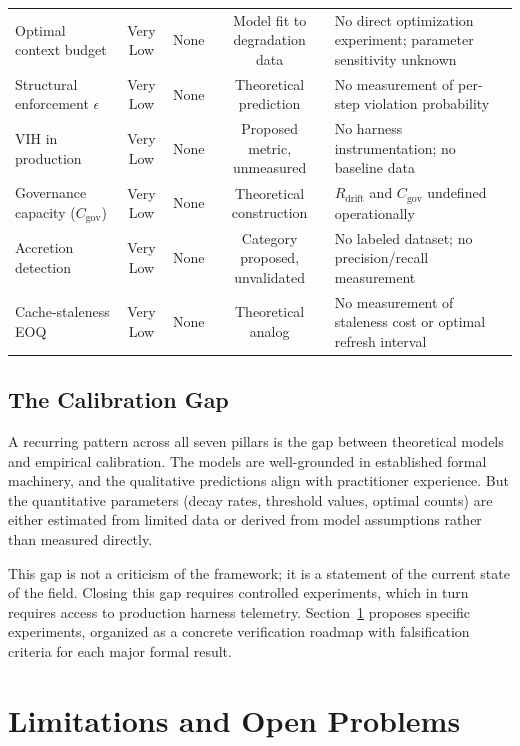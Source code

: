 \begin{table}[H]
\begin{tabular}{p{3cm}cccp{4.2cm}}
Optimal context budget & Very Low & None & Model fit to degradation data & No direct optimization experiment; parameter sensitivity unknown \\
\addlinespace
Structural enforcement $\epsilon$ & Very Low & None & Theoretical prediction & No measurement of per-step violation probability \\
\addlinespace
VIH in production & Very Low & None & Proposed metric, unmeasured & No harness instrumentation; no baseline data \\
\addlinespace
Governance capacity ($C_{\text{gov}}$) & Very Low & None & Theoretical construction & $R_{\text{drift}}$ and $C_{\text{gov}}$ undefined operationally \\
\addlinespace
Accretion detection & Very Low & None & Category proposed, unvalidated & No labeled dataset; no precision/recall measurement \\
\addlinespace
Cache-staleness EOQ & Very Low & None & Theoretical analog & No measurement of staleness cost or optimal refresh interval \\
\bottomrule
\end{tabular}
\end{table}

\subsection{The Calibration Gap}

A recurring pattern across all seven pillars is the gap between theoretical models and empirical calibration. The models are well-grounded in established formal machinery, and the qualitative predictions align with practitioner experience. But the quantitative parameters (decay rates, threshold values, optimal counts) are either estimated from limited data or derived from model assumptions rather than measured directly.

This gap is not a criticism of the framework; it is a statement of the current state of the field. Closing this gap requires controlled experiments, which in turn requires access to production harness telemetry. Section~\ref{sec:limitations} proposes specific experiments, organized as a concrete verification roadmap with falsification criteria for each major formal result.


\section{Limitations and Open Problems}
\label{sec:limitations}

